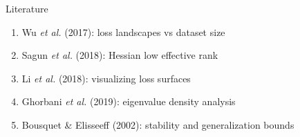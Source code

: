 \documentclass{beamer}
\begin{document}
\begin{frame}{Literature}
    \begin{enumerate}
        \item Wu \textit{et al.} (2017): loss landscapes vs dataset size
        \item Sagun \textit{et al.} (2018): Hessian low effective rank
        \item Li \textit{et al.} (2018): visualizing loss surfaces
        \item Ghorbani \textit{et al.} (2019): eigenvalue density analysis
        \item Bousquet \& Elisseeff (2002): stability and generalization bounds
    \end{enumerate}
\end{frame}
\end{document}
